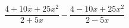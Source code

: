 \begin{ex}[type=expression]
	\begin{condition}
		\( \dfrac{4+10x+25x^2}{2+5x}-\dfrac{4-10x+25x^2}{2-5x} \)
	\end{condition}
\end{ex}
